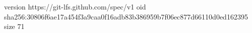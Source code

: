 version https://git-lfs.github.com/spec/v1
oid sha256:30806f6ae17a454f3a9caa0f16adb83b386959b7f06ec877d66110d0ed162395
size 71
